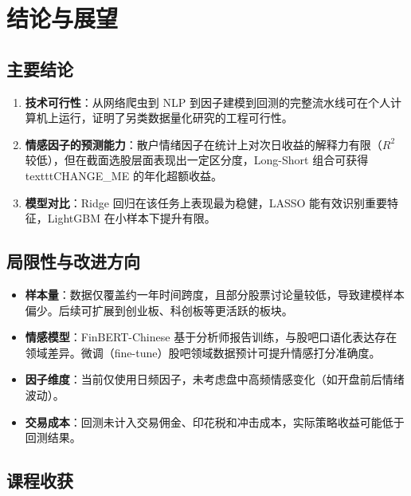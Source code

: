 \documentclass[12pt,a4paper]{ctexart}
\begin{document}
\newpage

\section{结论与展望}

\subsection{主要结论}

\begin{enumerate}[label=(\arabic*), leftmargin=*]
    \item \textbf{技术可行性}：从网络爬虫到 NLP 到因子建模到回测的完整流水线可在个人计算机上运行，证明了另类数据量化研究的工程可行性。
    \item \textbf{情感因子的预测能力}：散户情绪因子在统计上对次日收益的解释力有限（$R^2$ 较低），但在截面选股层面表现出一定区分度，Long-Short 组合可获得\\texttt{CHANGE\_ME} 的年化超额收益。
    \item \textbf{模型对比}：Ridge 回归在该任务上表现最为稳健，LASSO 能有效识别重要特征，LightGBM 在小样本下提升有限。
\end{enumerate}

\subsection{局限性与改进方向}

\begin{itemize}
    \item \textbf{样本量}：数据仅覆盖约一年时间跨度，且部分股票讨论量较低，导致建模样本偏少。后续可扩展到创业板、科创板等更活跃的板块。
    \item \textbf{情感模型}：FinBERT-Chinese 基于分析师报告训练，与股吧口语化表达存在领域差异。微调（fine-tune）股吧领域数据预计可提升情感打分准确度。
    \item \textbf{因子维度}：当前仅使用日频因子，未考虑盘中高频情感变化（如开盘前后情绪波动）。
    \item \textbf{交易成本}：回测未计入交易佣金、印花税和冲击成本，实际策略收益可能低于回测结果。
\end{itemize}

\subsection{课程收获}
\end{document}
